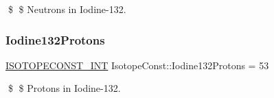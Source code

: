 \$ \$ Neutrons in Iodine-\/132. \mbox{\label{group___isotope_const-_iodine-_i132_gaae02b476564c58fa391c6507d91d729e}} 
\subsubsection{\texorpdfstring{Iodine132\+Protons}{Iodine132Protons}}
{\footnotesize\ttfamily \mbox{\hyperlink{group___isotope_const-_macros_ga5f18360b3e99483a35c32d789e62621c}{I\+S\+O\+T\+O\+P\+E\+C\+O\+N\+S\+T\+\_\+\+I\+NT}} Isotope\+Const\+::\+Iodine132\+Protons = 53}

\$ \$ Protons in Iodine-\/132. 